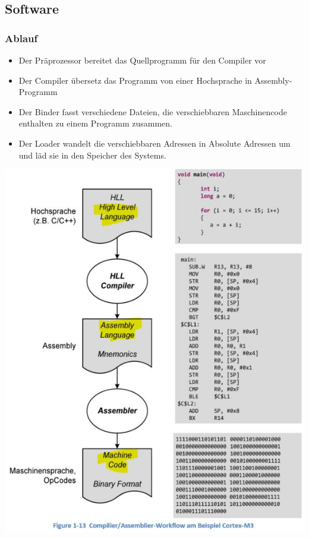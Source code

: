 \subsection{Software}
\begin{multicols}{2}
\subsubsection{Ablauf}
\begin{itemize}
    \item Der Präprozessor bereitet das Quellprogramm für den Compiler vor
    \item Der Compiler übersetz das Programm von einer Hochsprache in Assembly-Programm
    \item Der Binder fasst verschiedene Dateien, die verschiebbaren Maschinencode enthalten zu einem Programm zusammen.
    \item Der Loader wandelt die verschiebbaren Adressen in Absolute Adressen um und läd sie in den Speicher des Systems.
\end{itemize}

\includegraphics[width=\linewidth]{images/CompilerWorkflow}
\end{multicols}
\clearpage





















    